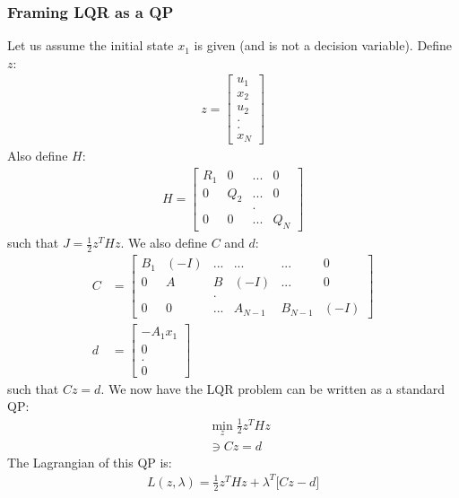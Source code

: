 \subsubsection{Framing LQR as a QP}
Let us assume the initial state $x_1$ is given (and is not a decision variable). Define $z$: 
\begin{align}
    z = \begin{bmatrix}
       u_1 \\
       x_2 \\
       u_2 \\
       . \\
       . \\
       x_N
    \end{bmatrix}
\end{align}
Also define $H$:
\begin{align}
    H = \begin{bmatrix}
        R_1 & 0   & ... & 0 \\
        0   & Q_2 & ... & 0 \\
        \   & \   & .   & \ \\
        0   & 0   & ... & Q_N
    \end{bmatrix}
\end{align}
such that $J = \frac{1}{2} z^T H z$. We also define $C$ and $d$: 
\begin{align}
    C &= \begin{bmatrix}
        B_1 & (-I)  & ...   & ...   & ...   & 0 \\
        0   & A     & B     & (-I)  & ...   & 0 \\
        \   & \     & .     & \ \\
        0   & 0     & ...   & A_{N-1} & B_{N-1} & (-I)
    \end{bmatrix} \\ 
    d &= \begin{bmatrix}
        -A_1 x_1 \\
        0 \\
        . \\ 
        0 
    \end{bmatrix}
\end{align}
such that $C z = d$. We now have the LQR problem can be written as a standard QP:
\begin{align}
    &\min_{z} \frac{1}{2} z^T H z \\
    \ &\ni C z = d
\end{align}
The Lagrangian of this QP is: 
\begin{align}
    L(z, \lambda) = \frac{1}{2} z^T H z + \lambda^T \big[ C z - d\big]
\end{align}

